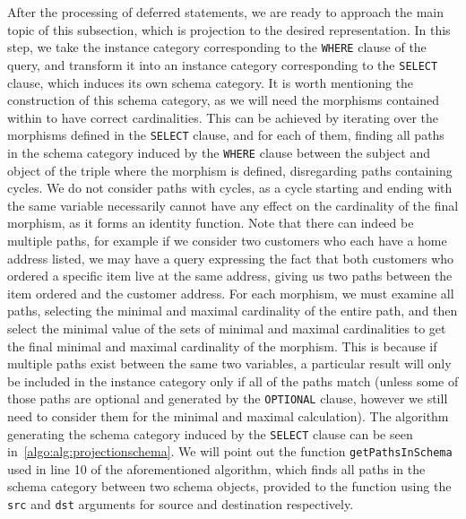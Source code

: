 After the processing of deferred statements, we are ready to approach the main topic of this subsection, which is projection to the desired representation.
In this step, we take the instance category corresponding to the \texttt{WHERE} clause of the query, and transform it into an instance category corresponding to the \texttt{SELECT} clause, which induces its own schema category.
It is worth mentioning the construction of this schema category, as we will need the morphisms contained within to have correct cardinalities.
This can be achieved by iterating over the morphisms defined in the \texttt{SELECT} clause, and for each of them, finding all paths in the schema category induced by the \texttt{WHERE} clause between the subject and object of the triple where the morphism is defined, disregarding paths containing cycles.
We do not consider paths with cycles, as a cycle starting and ending with the same variable necessarily cannot have any effect on the cardinality of the final morphism, as it forms an identity function.
Note that there can indeed be multiple paths, for example if we consider two customers who each have a home address listed, we may have a query expressing the fact that both customers who ordered a specific item live at the same address, giving us two paths between the item ordered and the customer address.
For each morphism, we must examine all paths, selecting the minimal and maximal cardinality of the entire path, and then select the minimal value of the sets of minimal and maximal cardinalities to get the final minimal and maximal cardinality of the morphism.
This is because if multiple paths exist between the same two variables, a particular result will only be included in the instance category only if all of the paths match (unless some of those paths are optional and generated by the \texttt{OPTIONAL} clause, however we still need to consider them for the minimal and maximal calculation).
The algorithm generating the schema category induced by the \texttt{SELECT} clause can be seen in~\cref{algo:alg:projectionschema}.
We will point out the function \texttt{getPathsInSchema} used in line 10 of the aforementioned algorithm, which finds all paths in the schema category between two schema objects, provided to the function using the \texttt{src} and \texttt{dst} arguments for source and destination respectively.

